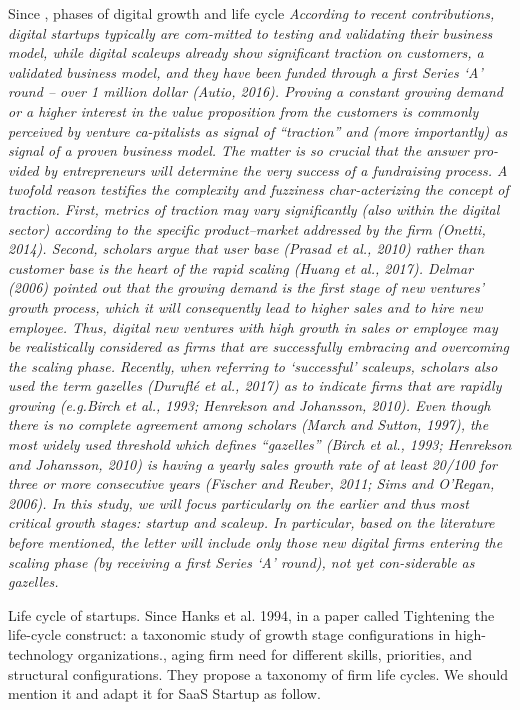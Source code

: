 Since \citet{cavallo2019fostering}, phases of digital growth and life cycle \textit{According to recent contributions, digital startups typically are com-mitted to testing and validating their business model, while digital scaleups already show significant traction on customers, a validated business model, and they have been funded through a first Series ‘A’ round – over 1 million dollar (Autio, 2016). Proving a constant growing demand or a higher interest in the value proposition from the customers is commonly perceived by venture ca-pitalists as signal of “traction” and (more importantly) as signal of a proven business model. The matter is so crucial that the answer pro-vided by entrepreneurs will determine the very success of a fundraising process. A twofold reason testifies the complexity and fuzziness char-acterizing the concept of traction. First, metrics of traction may vary significantly (also within the digital sector) according to the specific product–market addressed by the firm (Onetti, 2014). Second, scholars argue that user base (Prasad et al., 2010) rather than customer base is the heart of the rapid scaling (Huang et al., 2017). Delmar (2006) pointed out that the growing demand is the first stage of new ventures' growth process, which it will consequently lead to higher sales and to hire new employee. Thus, digital new ventures with high growth in sales or employee may be realistically considered as firms that are successfully embracing and overcoming the scaling phase. Recently, when referring to ‘successful’ scaleups, scholars also used the term gazelles (Duruflé et al., 2017) as to indicate firms that are rapidly growing (e.g.Birch et al., 1993; Henrekson and Johansson, 2010). Even though there is no complete agreement among scholars (March and Sutton, 1997), the most widely used threshold which defines “gazelles” (Birch et al., 1993; Henrekson and Johansson, 2010) is having a yearly sales growth rate of at least 20/100 for three or more consecutive years (Fischer and Reuber, 2011; Sims and O'Regan, 2006). In this study, we will focus particularly on the earlier and thus most critical growth stages: startup and scaleup. In particular, based on the literature before mentioned, the letter will include only those new digital firms entering the scaling phase (by receiving a first Series ‘A’ round), not yet con-siderable as gazelles.}

Life cycle of startups. Since Hanks et al. 1994, in a paper called Tightening the life-cycle construct: a taxonomic study of growth stage configurations in high-technology organizations., aging firm need for different skills, priorities, and structural configurations. They propose a taxonomy of firm life cycles. We should mention it and adapt it for SaaS Startup as follow.

